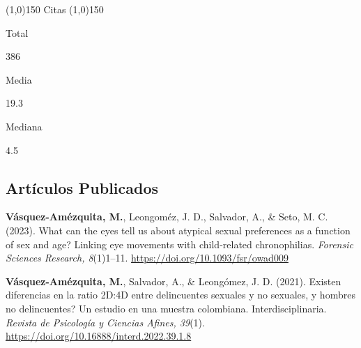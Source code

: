 \documentclass[11pt,a4paper,]{awesome-cv}
\begin{document}
\begin{tcolorbox}
  \begin{center} \noindent\line(1,0){150} Citas \noindent\line(1,0){150} \end{center}
  
  \begin{minipage}[c]{0.325\linewidth}  
    \begin{center} 
      \begin{small} Total \end{small} 
      \begin{LARGE} 386 \end{LARGE} 
    \end{center}
  \end{minipage} 
  \begin{minipage}[c]{0.325\linewidth}
    \begin{center} 
      \begin{small} Media \end{small} 
      \begin{LARGE} 19.3 \end{LARGE}
    \end{center}
  \end{minipage} 
  \begin{minipage}[c]{0.325\linewidth}
    \begin{center}  
      \begin{small} Mediana \end{small} 
      \begin{LARGE} 4.5 \end{LARGE}
   \end{center}
  \end{minipage} 
\end{tcolorbox}

\hypertarget{section}{%
\subsection{\texorpdfstring{\textbf{Artículos Publicados}}{}}\label{section}}

\begingroup
\footnotesize
\setlength{\parindent}{-0.5in}
\setlength{\leftskip}{0.5in}

\textbf{Vásquez-Amézquita, M.}, Leongoméz, J. D., Salvador, A., \& Seto,
M. C. (2023). What can the eyes tell us about atypical sexual
preferences as a function of sex and age? Linking eye movements with
child-related chronophilias. \emph{Forensic Sciences Research,
8}(1)1--11. \url{https://doi.org/10.1093/fsr/owad009}

\textbf{Vásquez-Amézquita, M.}, Salvador, A., \& Leongómez, J. D.
(2021). Existen diferencias en la ratio 2D:4D entre delincuentes
sexuales y no sexuales, y hombres no delincuentes? Un estudio en una
muestra colombiana. Interdisciplinaria. \emph{Revista de Psicología y
Ciencias Afines, 39}(1).
\url{https://doi.org/10.16888/interd.2022.39.1.8}
\end{document}
